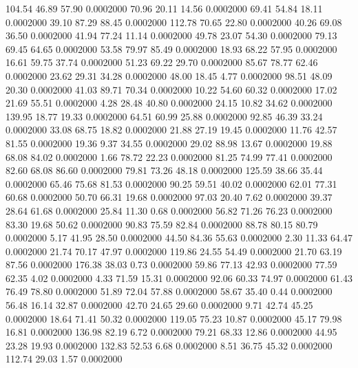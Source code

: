  104.54   46.89   57.90   0.0002000
  70.96   20.11   14.56   0.0002000
  69.41   54.84   18.11   0.0002000
  39.10   87.29   88.45   0.0002000
 112.78   70.65   22.80   0.0002000
  40.26   69.08   36.50   0.0002000
  41.94   77.24   11.14   0.0002000
  49.78   23.07   54.30   0.0002000
  79.13   69.45   64.65   0.0002000
  53.58   79.97   85.49   0.0002000
  18.93   68.22   57.95   0.0002000
  16.61   59.75   37.74   0.0002000
  51.23   69.22   29.70   0.0002000
  85.67   78.77   62.46   0.0002000
  23.62   29.31   34.28   0.0002000
  48.00   18.45    4.77   0.0002000
  98.51   48.09   20.30   0.0002000
  41.03   89.71   70.34   0.0002000
  10.22   54.60   60.32   0.0002000
  17.02   21.69   55.51   0.0002000
   4.28   28.48   40.80   0.0002000
  24.15   10.82   34.62   0.0002000
 139.95   18.77   19.33   0.0002000
  64.51   60.99   25.88   0.0002000
  92.85   46.39   33.24   0.0002000
  33.08   68.75   18.82   0.0002000
  21.88   27.19   19.45   0.0002000
  11.76   42.57   81.55   0.0002000
  19.36    9.37   34.55   0.0002000
  29.02   88.98   13.67   0.0002000
  19.88   68.08   84.02   0.0002000
   1.66   78.72   22.23   0.0002000
  81.25   74.99   77.41   0.0002000
  82.60   68.08   86.60   0.0002000
  79.81   73.26   48.18   0.0002000
 125.59   38.66   35.44   0.0002000
  65.46   75.68   81.53   0.0002000
  90.25   59.51   40.02   0.0002000
  62.01   77.31   60.68   0.0002000
  50.70   66.31   19.68   0.0002000
  97.03   20.40    7.62   0.0002000
  39.37   28.64   61.68   0.0002000
  25.84   11.30    0.68   0.0002000
  56.82   71.26   76.23   0.0002000
  83.30   19.68   50.62   0.0002000
  90.83   75.59   82.84   0.0002000
  88.78   80.15   80.79   0.0002000
   5.17   41.95   28.50   0.0002000
  44.50   84.36   55.63   0.0002000
   2.30   11.33   64.47   0.0002000
  21.74   70.17   47.97   0.0002000
 119.86   24.55   54.49   0.0002000
  21.70   63.19   87.56   0.0002000
 176.38   38.03    0.73   0.0002000
  59.86   77.13   42.93   0.0002000
  77.59   62.35    4.02   0.0002000
   4.33   71.59   15.31   0.0002000
  92.06   60.33   74.97   0.0002000
  61.43   76.49   78.80   0.0002000
  51.89   72.04   57.88   0.0002000
  58.67   35.40    0.44   0.0002000
  56.48   16.14   32.87   0.0002000
  42.70   24.65   29.60   0.0002000
   9.71   42.74   45.25   0.0002000
  18.64   71.41   50.32   0.0002000
 119.05   75.23   10.87   0.0002000
  45.17   79.98   16.81   0.0002000
 136.98   82.19    6.72   0.0002000
  79.21   68.33   12.86   0.0002000
  44.95   23.28   19.93   0.0002000
 132.83   52.53    6.68   0.0002000
   8.51   36.75   45.32   0.0002000
 112.74   29.03    1.57   0.0002000

